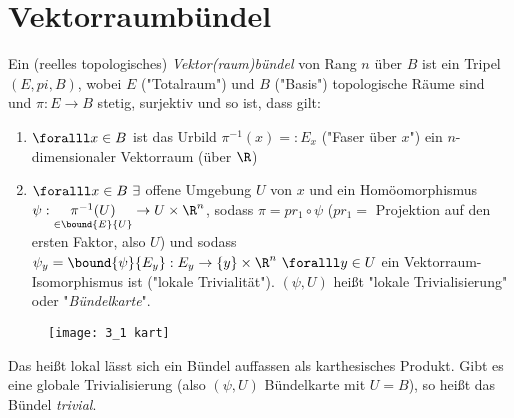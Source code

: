 \chapter{Vektorraumbündel}\lecture 


\begin{defn}[Vektorraumbündel]
	Ein (reelles topologisches) \emph{Vektor(raum)bündel} von Rang $n$ über $B$ ist ein Tripel $(E,pi,B)$, wobei $E$ ("Totalraum") und $B$ ("Basis") topologische Räume sind und $\pi: E \to B$ stetig, surjektiv und so ist, dass gilt:
	\begin{enumerate}[label={\roman*})]
		\item $\foralll x \in B$ ist das Urbild $\pi^{-1}(x) =: E_x$ ("Faser über $x$") ein $n$-dimensionaler Vektorraum (über $\R$)
		\item $\foralll x \in B \ \exists$ offene Umgebung $U$ von $x$ und ein Homöomorphismus $\psi: \underset{\in \bound{E}{U}}{\pi^{-1} (U)} \to U \times \R^n$, sodass $\pi = pr_1 \circ \psi$ ($pr_1 =$ Projektion auf den ersten Faktor, also $U$) und sodass $\psi_y = \bound{\psi}{E_y} : E_y \to \{y\} \times \R^n \ \foralll y \in U$ ein Vektorraum-Isomorphismus ist ("lokale Trivialität"). $(\psi,U)$ heißt "lokale Trivialisierung" oder "\emph{Bündelkarte}".
	\end{enumerate}
\end{defn}

\begin{minipage}{\linewidth}
	\begin{wrapfigure}{R}{8cm}
		\centering
		\texttt{[image: 3\_1 kart]}
	\end{wrapfigure}

	Das heißt lokal lässt sich ein Bündel auffassen als karthesisches Produkt. Gibt es eine globale Trivialisierung (also $(\psi,U)$ Bündelkarte mit $U = B$), so heißt das Bündel \emph{trivial}.
\end{minipage}

